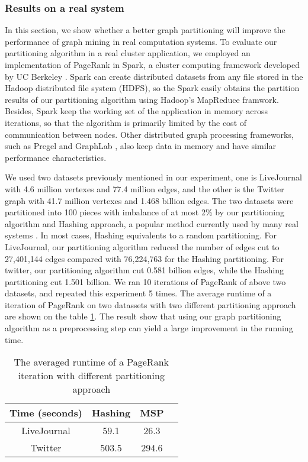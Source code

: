 \documentclass{acm_proc_article-sp}
\begin{document}
\subsubsection {Results on a real system}
In this section,  we show whether a better graph partitioning will improve the performance of graph mining in real computation systems. To evaluate our partitioning algorithm in a real cluster application, we employed an implementation of PageRank in Spark, a cluster computing framework developed by UC Berkeley \cite{Berkeley:spark}. Spark can create distributed datasets from any file stored in the Hadoop distributed file system (HDFS), so the Spark easily obtains the partition results of our partitioning algorithm using Hadoop's MapReduce framwork. Besides, Spark keep the working set of the application in memory across iterations, so that the algorithm is primarily limited by the cost of communication between nodes. Other distributed graph processing frameworks, such as Pregel \cite{malewicz:pregel} and GraphLab \cite{yucheng:graphlab}, also keep data in memory and have similar performance characteristics.
\par
We used two datasets previously mentioned in our experiment, one is LiveJournal with 4.6 million vertexes and 77.4 million edges, and the other is the Twitter graph with 41.7 million vertexes and 1.468 billion edges. The two datasets were partitioned into 100 pieces with imbalance of at most 2\% by our partitioning algorithm and Hashing approach, a popular method currently used by many real systems \cite{malewicz:pregel}. In most cases, Hashing equivalents to a random partitioning. For LiveJournal, our partitioning algorithm reduced the number of edges cut to 27,401,144 edges compared with 76,224,763 for the Hashing partitioning. For twitter, our partitioning algorithm cut 0.581 billion edges, while the Hashing partitioning cut 1.501 billion. We ran 10 iterations of PageRank of above two datasets, and repeated this experiment 5 times. The average runtime of a iteration of PageRank on two datassets with two different partitioning approach are shown on the table \ref{table:par}. The result show that using our graph partitioning algorithm as a preprocessing step can yield a large improvement in the running time.
\begin{table}
\centering
\caption{The averaged runtime of a PageRank iteration with different partitioning approach}
\label{table:par}
\begin{tabular}{|c|c|c|c|}
\hline
 Time (seconds)  &   Hashing   &   MSP     \\
\hline
LiveJournal          & 59.1   & 26.3    \\
\hline
Twitter         	& 503.5 	 & 294.6   \\
\hline
\end{tabular}
\end{table}
\end{document}

